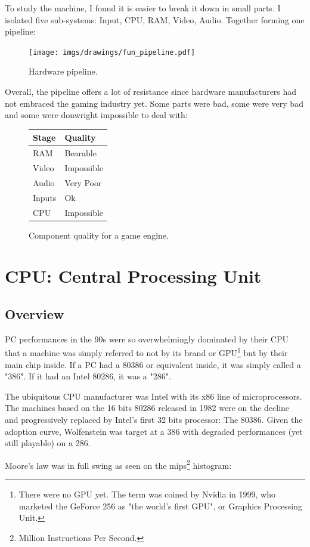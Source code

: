 \documentclass[book.tex]{subfiles}
\begin{document}
To study the machine, I found it is easier to break it down in small parts. I isolated five sub-systems: Input, CPU, RAM, Video, Audio. Together forming one pipeline:\\
\begin{figure}[H]
\centering
\texttt{[image: imgs/drawings/fun\_pipeline.pdf]}
\caption{Hardware pipeline.}
\label{fig:digraph}
\end{figure}

Overall, the pipeline offers a lot of resistance since hardware manufacturers had not embraced the gaming industry yet. Some parts were bad, some were very bad and some were donwright impossible to deal with:\\
\par

\begin{figure}[H]
\centering
\begin{tabularx}{\textwidth}{ X X  }
  \toprule
  \textbf{Stage} & \textbf{Quality} \\ \bottomrule
  RAM & Bearable \\ 
  Video & Impossible \\ 
  Audio & Very Poor \\ 
  Inputs & Ok \\ 
  CPU & Impossible \\ \bottomrule
\end{tabularx}
\caption{Component quality for a game engine.}
\end{figure}



\section{CPU: Central Processing Unit}
  \subsection{Overview}
  PC performances in the 90s were so overwhelmingly dominated by their CPU that a machine was simply referred to not by its brand or GPU\footnote{There were no GPU yet. The term was coined by Nvidia in 1999, who marketed the GeForce 256 as "the world's first GPU", or Graphics Processing Unit.} but by their main chip inside. If a PC had a 80386 or equivalent inside, it was simply called a "386". If it had an Intel 80286, it was a "286".\\
\par
  The ubiquitous CPU manufacturer was Intel with its x86 line of microprocessors. The machines based on the 16 bits 80286 released in 1982 were on the decline and progressively replaced by Intel's first 32 bits processor: The 80386. Given the adoption curve, Wolfenstein was target at a 386 with degraded performances (yet still playable) on a 286.\\
\par
  Moore's law was in full swing as seen on the mips\footnote{Million Instructions Per Second.} histogram:
\end{document}
